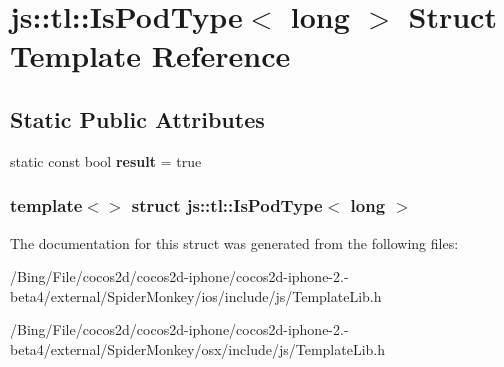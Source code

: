 \hypertarget{structjs_1_1tl_1_1_is_pod_type_3_01long_01_4}{\section{js\-:\-:tl\-:\-:Is\-Pod\-Type$<$ long $>$ Struct Template Reference}
\label{structjs_1_1tl_1_1_is_pod_type_3_01long_01_4}
}
\subsection*{Static Public Attributes}
\begin{DoxyCompactItemize}
\item 
\hypertarget{structjs_1_1tl_1_1_is_pod_type_3_01long_01_4_a3be476d799abdf03d14f0ebb700cf0b6}{static const bool {\bfseries result} = true}\label{structjs_1_1tl_1_1_is_pod_type_3_01long_01_4_a3be476d799abdf03d14f0ebb700cf0b6}

\end{DoxyCompactItemize}
\subsubsection*{template$<$$>$ struct js\-::tl\-::\-Is\-Pod\-Type$<$ long $>$}



The documentation for this struct was generated from the following files\-:\begin{DoxyCompactItemize}
\item 
/\-Bing/\-File/cocos2d/cocos2d-\/iphone/cocos2d-\/iphone-\/2.-\/beta4/external/\-Spider\-Monkey/ios/include/js/Template\-Lib.\-h\item 
/\-Bing/\-File/cocos2d/cocos2d-\/iphone/cocos2d-\/iphone-\/2.-\/beta4/external/\-Spider\-Monkey/osx/include/js/Template\-Lib.\-h\end{DoxyCompactItemize}
